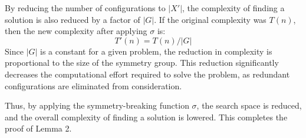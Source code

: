 \documentclass{article}
\begin{document}
By reducing the number of configurations to $|X'|$, the complexity of finding a solution is also reduced by a factor of $|G|$. If the original complexity was $T(n)$, then the new complexity after applying $\sigma$ is:
\[
    T'(n) = T(n) / |G|
\]
Since $|G|$ is a constant for a given problem, the reduction in complexity is proportional to the size of the symmetry group. This reduction significantly decreases the computational effort required to solve the problem, as redundant configurations are eliminated from consideration.

Thus, by applying the symmetry-breaking function $\sigma$, the search space is reduced, and the overall complexity of finding a solution is lowered. This completes the proof of Lemma 2.
\end{document}
